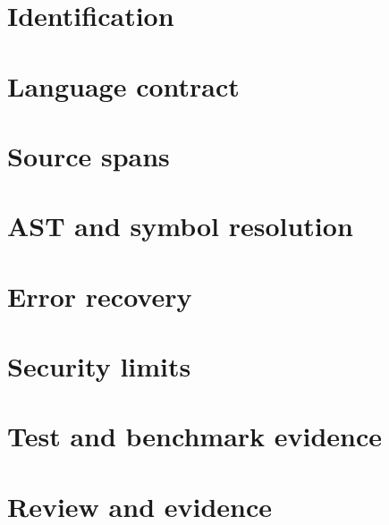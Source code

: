 \documentclass[11pt,letterpaper]{article}
\begin{document}
\makedoctitle\makedocsummary
\section{Identification}
\section{Language contract}
\section{Source spans}
\section{AST and symbol resolution}
\section{Error recovery}
\section{Security limits}
\section{Test and benchmark evidence}
\section{Review and evidence}
\end{document}
